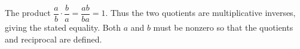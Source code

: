 The product $\dfrac{a}{b}\cdot\dfrac{b}{a}=\dfrac{ab}{ba}=1$. Thus the two quotients are multiplicative inverses, giving the stated equality. Both $a$ and $b$ must be nonzero so that the quotients and reciprocal are defined.
